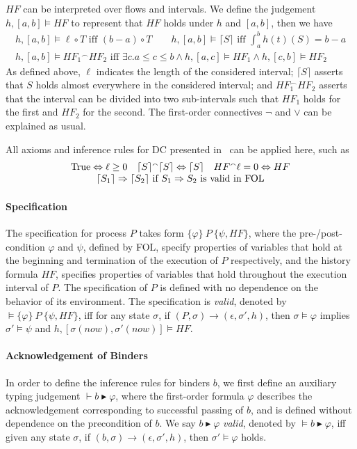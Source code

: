 \documentclass{llncs}
\newcommand{\leadm}[1]{\xrightarrow{#1}}
\newcommand{\pstop}{\epsilon}
\newcommand{\ltrue}{\textmd{True}}
\newcommand{\chop}{\smallfrown}
\newcommand{\typeb}[2]{\vdash #1 \blacktriangleright #2}
\newcommand{\soundb}[2]{\models #1 \blacktriangleright #2}
\newcommand{\inference}[3]{\{#1\} \ #2\ \{#3\}}
\newcommand{\dceil}[1]{\lceil #1 \rceil}
\newcommand{\Pre}{\varphi}
\newcommand{\Post}{\psi}
\newcommand{\HF}{HF}
\begin{document}
$HF$ can be interpreted over flows and intervals. We define the judgement $h, [a, b] \models HF$ to
represent that $HF$ holds under $h$ and $[a, b]$, then we have
\[
\begin{array}{ll}
  h, [a, b] \models \ell \circ T \mbox{ iff } (b-a) \circ T\qquad
  h, [a, b] \models \dceil{S} \mbox{ iff } \int_{a}^{b} h(t)(S) = b-a\\
   h, [a, b] \models HF_1 {}^\chop HF_2 \mbox{ iff } \exists c. a \leq c \leq b \wedge h, [a, c] \models HF_1 \wedge   h, [c, b] \models HF_2
\end{array}\]
 As defined above,
$\ell$ indicates the length of the considered interval;
 $\lceil S \rceil$ asserts that
  $S$ holds almost everywhere in the considered interval;
and $HF_1 ^\frown HF_2$ asserts that the interval can be divided into two sub-intervals such that
$HF_1$ holds for the first and $HF_2$ for the second. The first-order connectives $\neg$ and
$\vee$ can be explained as usual.

All  axioms and inference rules for DC presented in~\cite{ZH04} can be applied here,  such as
\[
\begin{array}{c}
  \ltrue \Leftrightarrow \ell \geq 0 \quad \dceil{S} {}^\chop \dceil{S} \Leftrightarrow \dceil{S} \quad HF ^\chop \ell = 0 \Leftrightarrow HF\\
  \dceil{S_1} \Rightarrow \dceil{S_2} \mbox{ if $S_1 \Rightarrow S_2$ is valid in FOL}\\
   \end{array}\]

\paragraph{\textbf{Specification}}
The specification for process $P$ takes form
$\inference{\Pre}{P}{\Post, \HF}$,
where  the pre-/post-condition $\Pre$ and $\Post$, defined by FOL,
specify properties of
variables that hold at the beginning  and termination of the execution of $P$ respectively,
 and the history formula $\HF$, specifies properties of  variables
 that hold throughout the execution interval of $P$. The specification of $P$ is
 defined with no dependence on
the behavior of its environment.
The specification is \emph{valid}, denoted by
$\models \inference{\Pre}{P}{\Post, \HF}$,
iff for any state $\sigma$, if $(P, \sigma) \leadm{} (\pstop, \sigma', h)$, then $\sigma \models \Pre$ implies
$\sigma' \models \Post$ and $h, [\sigma(now), \sigma'(now)] \models \HF$.

 \paragraph{\textbf{Acknowledgement of Binders }}
In order to define the inference rules for binders $b$, we first define
an auxiliary typing judgement $\typeb{b}{\varphi}$,
where  the first-order formula $\varphi$ describes the acknowledgement corresponding to successful passing of $b$,
and is defined without dependence on the precondition of $b$.
We say $b \blacktriangleright \varphi$ \emph{valid},
denoted by $\soundb{b}{\varphi}$,  iff
given any state $\sigma$, if $(b, \sigma) \leadm{ } (\pstop, \sigma', h)$, then
$\sigma'\models \varphi$ holds.
\end{document}
